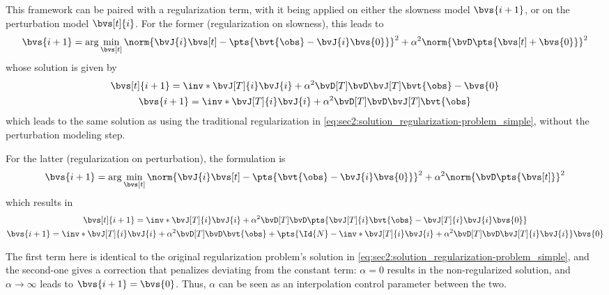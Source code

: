 This framework can be paired with a regularization term, with it being applied on either the slowness model $\bvs{i+1}$, or on the perturbation model $\bvs[t]{i}$. For the former (regularization on slowness), this leads to
\begin{equation}
	\bvs{i+1} = \arg\min_{\bvs[t]} \norm{\bvJ{i} \bvs[t] - \pts{\bvt{\obs} - \bvJ{i} \bvs{0}}}^2 + \alpha^2\norm{\bvD \pts{\bvs[t] + \bvs{0}}}^2 
\end{equation}
whose solution is given by
\begin{subequations}
	\begin{gather}
		\bvs[t]{i+1} = \inv*{\bvJ[T]{i} \bvJ{i} + \alpha^2 \bvD[T] \bvD} \bvJ[T] \bvt{\obs} - \bvs{0} \\
		\bvs{i+1} = \inv*{\bvJ[T]{i} \bvJ{i} + \alpha^2 \bvD[T] \bvD} \bvJ[T] \bvt{\obs}
	\end{gather}
\end{subequations}
which leads to the same solution as using the traditional regularization in \cref{eq:sec2:solution_regularization-problem_simple}, without the perturbation modeling step.

For the latter (regularization on perturbation), the formulation is
\begin{equation}
	\bvs{i+1} = \arg\min_{\bvs[t]} \norm{\bvJ{i} \bvs[t] - \pts{\bvt{\obs} - \bvJ{i} \bvs{0}}}^2 + \alpha^2\norm{\bvD \pts{\bvs[t]}}^2 
	\label{eq:sec3:minimization_perturbation-with-regularization_formulation}
\end{equation}
which results in
\begin{subequations}
	\begin{gather}
		\bvs[t]{i+1} = \inv*{\bvJ[T]{i} \bvJ{i} + \alpha^2 \bvD[T] \bvD} \pts{\bvJ[T]{i} \bvt{\obs} - \bvJ[T]{i} \bvJ{i} \bvs{0}} \\
		\bvs{i+1} = \inv*{\bvJ[T]{i} \bvJ{i} + \alpha^2 \bvD[T] \bvD} \bvt{\obs} + \pts{\Id{N} - \inv*{\bvJ[T]{i} \bvJ{i} + \alpha^2 \bvD[T] \bvD} \bvJ[T]{i} \bvJ{i}} \bvs{0}
	\end{gather}
\end{subequations}

The first term here is identical to the original regularization problem's solution in \cref{eq:sec2:solution_regularization-problem_simple}, and the second-one gives a correction that penalizes deviating from the constant term: $\alpha = 0$ results in the non-regularized solution, and $\alpha \to \infty$ leads to $\bvs{i+1} = \bvs{0}$. Thus, $\alpha$ can be seen as an interpolation control parameter between the two.

